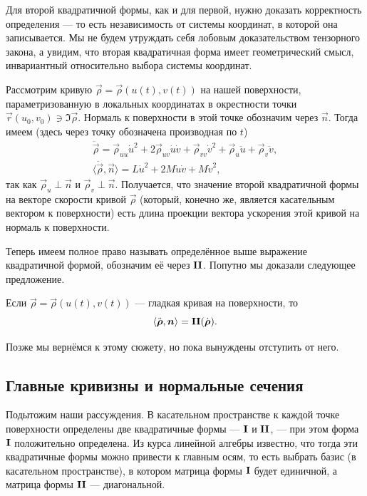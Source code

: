 Для второй квадратичной формы, как и для первой, нужно доказать корректность определения --- то есть независимость от системы координат, в которой она записывается. Мы не будем утруждать себя лобовым доказательством тензорного закона, а увидим, что вторая квадратичная форма имеет геометрический смысл, инвариантный относительно выбора системы координат.

Рассмотрим кривую $\vec{\rho} = \vec{\rho}(u(t), v(t))$ на нашей поверхности, параметризованную в локальных координатах в окрестности точки $\vec{r}(u_0, v_0) \ni \Im\vec{\rho}$. Нормаль к поверхности в этой точке обозначим через $\vec{n}$. Тогда имеем (здесь через точку обозначена производная по $t$)
\begin{gather*}
	\ddot{\vec{\rho}} = \vec{\rho}_{uu}\dot{u}^2 + 2\vec{\rho}_{uv}\dot{u}\dot{v} + \vec{\rho}_{vv}\dot{v}^2 + \vec{\rho}_u\ddot{u} + \vec{\rho}_v\ddot{v},\\
	\langle\ddot{\vec{\rho}}, \vec{n}\rangle = L\dot{u}^2 + 2M\dot{u}\dot{v} + M\dot{v}^2,
\end{gather*}
так как $\vec{\rho}_u \perp \vec{n}$ и $\vec{\rho}_v \perp \vec{n}$. Получается, что значение второй квадратичной формы на векторе скорости кривой $\vec{\rho}$ (который, конечно же, является касательным вектором к поверхности) есть длина проекции вектора ускорения этой кривой на нормаль к поверхности.

Теперь имеем полное право называть определённое выше выражение квадратичной формой, обозначим её через $\boldsymbol{\operatorname{II}}$. Попутно мы доказали следующее предложение.

\begin{proposition} \label{proposition:GeomII}
	Если $\vec{\rho} = \vec{\rho}(u(t), v(t))$ --- гладкая кривая на поверхности, то
	\[
		\langle\ddot{\boldsymbol{\rho}}, \boldsymbol{n}\rangle = \boldsymbol{\operatorname{II}}(\dot{\boldsymbol{\rho}}).
	\]
\end{proposition}

\noindent%
Позже мы вернёмся к этому сюжету, но пока вынуждены отступить от него.

\subsection{Главные кривизны и нормальные сечения}

Подытожим наши рассуждения. В касательном пространстве к каждой точке поверхности определены две квадратичные формы --- $\boldsymbol{\operatorname{I}}$ и $\boldsymbol{\operatorname{II}}$, --- при этом форма $\boldsymbol{\operatorname{I}}$ положительно определена. Из курса линейной алгебры известно, что тогда эти квадратичные формы можно привести к главным осям, то есть выбрать базис (в касательном пространстве), в котором матрица формы $\boldsymbol{\operatorname{I}}$ будет единичной, а матрица формы $\boldsymbol{\operatorname{II}}$ --- диагональной.

